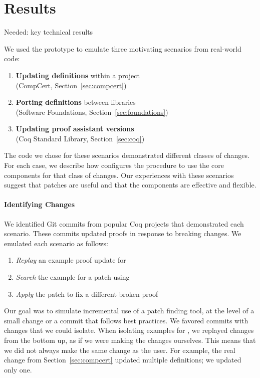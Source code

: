 \section{Results}
\label{sec:case}

Needed: key technical results


We used the \sysname prototype to emulate three motivating scenarios from real-world code:

\begin{enumerate}
\item \textbf{Updating definitions} within a project \\
(CompCert, Section~\ref{sec:compcert})
\item \textbf{Porting definitions} between libraries \\
(Software Foundations, Section~\ref{sec:foundations})
\item \textbf{Updating proof assistant versions} \\
(Coq Standard Library, Section~\ref{sec:coq})
\end{enumerate}

The code we chose for these scenarios demonstrated different classes of changes.
For each case, we describe how \sysname configures the procedure to use the core components for that class of changes.
Our experiences with these scenarios suggest that patches are useful and that the components 
are effective and flexible.

\paragraph{Identifying Changes} We identified Git commits from popular Coq projects that
demonstrated each scenario.
These commits updated proofs in response to breaking changes.
We emulated each scenario as follows:

\begin{enumerate}
\item \textit{Replay} an example proof update for \sysname
\item \textit{Search} the example for a patch using \sysname
\item \textit{Apply} the patch to fix a different broken proof
\end{enumerate}

Our goal was to simulate incremental use of a patch finding tool,
at the level of a small change or a commit that follows best practices.
We favored commits with changes that we could
isolate. When isolating examples for \sysname, we replayed changes from the bottom up,
as if we were making the changes ourselves.
This means that we did not always make the same change as the user. For example,
the real change from Section~\ref{sec:compcert} updated multiple definitions;
we updated only one.

